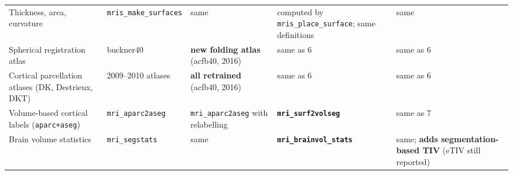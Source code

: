 \documentclass[11pt]{article}
\begin{document}
\begin{landscape}
{\begin{longtable}{p{3.2cm}p{4.2cm}p{4.6cm}p{4.6cm}p{5.2cm}}
Thickness, area, curvature & \texttt{mris\_make\_surfaces} & same & computed by \texttt{mris\_place\_surface}; same
definitions & same \\
Spherical registration atlas & buckner40 & \textbf{new folding atlas} (acfb40, 2016) & same as 6 & same as 6 \\
Cortical parcellation atlases (DK, Destrieux, DKT) & 2009--2010 atlases & \textbf{all retrained} (acfb40, 2016) &
same as 6 & same as 6 \\
Volume-based cortical labels (\texttt{aparc+aseg}) & \texttt{mri\_aparc2aseg} & \texttt{mri\_aparc2aseg} with
relabelling & \textbf{\texttt{mri\_surf2volseg}} & same as 7 \\
Brain volume statistics & \texttt{mri\_segstats} & same & \textbf{\texttt{mri\_brainvol\_stats}} & same;
\textbf{adds segmentation-based TIV} (eTIV still reported) \\
\end{longtable}}
\end{landscape}

\clearpage
\setcounter{table}{39}
\begin{table}[H]
\centering\small
\caption{}\label{tab:S40}

\end{table}
\end{document}
